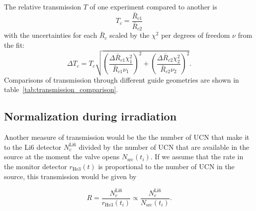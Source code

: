 \documentclass[10pt,letterpaper]{article}
\begin{document}
The relative transmission $T$ of one experiment compared to another is
\begin{equation}
T_c = \frac{\bar{R}_{c1}}{\bar{R}_{c2}}
\end{equation}
with the uncertainties for each $\bar{R}_c$ scaled by the $\chi^2$ per degrees of freedom $\nu$ from the fit:
\begin{equation}
\label{eq:transmission_end}
\Delta T_c = T_c \sqrt{ \left( \frac{\Delta \bar{R}_{c1} \chi_1^2}{\bar{R}_{c1} \nu_1} \right)^2 + \left( \frac{\Delta \bar{R}_{c2} \chi_2^2}{\bar{R}_{c2} \nu_2} \right)^2 }.
\end{equation}
Comparisons of transmission through different guide geometries are shown in table~\ref{tab:transmission_comparison}.


\subsection{Normalization during irradiation}

Another measure of transmission would be the the number of UCN that make it to the Li6 detector $N^\mathrm{Li6}_c$ divided by the number of UCN that are available in the source at the moment the valve opens $N_\mathrm{src}(t_i)$.
If we assume that the rate in the monitor detector $r_\mathrm{He3}(t)$ is proportional to the number of UCN in the source, this transmission would be given by

\begin{equation}
\label{eq:normalization_irradiation_begin}
R = \frac{N_c^\mathrm{Li6}}{r_\mathrm{He3}(t_i)} \propto \frac{N_c^\mathrm{Li6}}{N_\mathrm{src}(t_i)} .
\end{equation}
\end{document}
